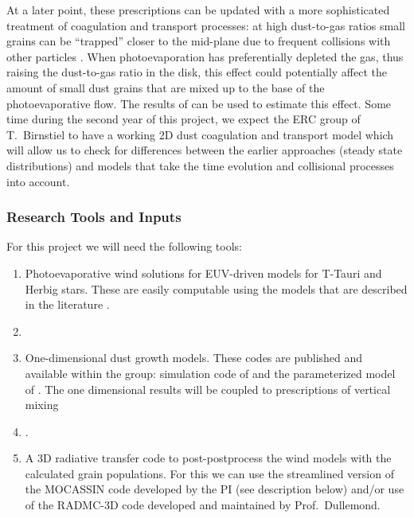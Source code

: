 \documentclass[10pt,fleqn,twoside]{article}
\begin{document}
At a later point, these prescriptions can be updated with a more
sophisticated treatment of coagulation and transport processes: at
high dust-to-gas ratios small grains can be ``trapped'' closer to the
mid-plane due to frequent collisions with other particles
\citep{2016ApJ...822..111K}. When photoevaporation has preferentially
depleted the gas, thus raising the dust-to-gas ratio in the disk, this
effect could potentially affect the amount of small dust grains that
are mixed up to the base of the photoevaporative flow. The results of
\citet{2016ApJ...822..111K} can be used to estimate this effect.
Some time during the second  year of this project, we expect the ERC
group of T.\ Birnstiel to have a working 2D dust coagulation and
transport model which will allow us to check for differences between
the earlier approaches (steady state distributions) and models that
take the time evolution and collisional processes into account.

\subsubsection{Research Tools and Inputs}

For this project we will need the following tools:
\begin{enumerate}
\item Photoevaporative wind solutions for EUV-driven
models for T-Tauri and Herbig stars. These are easily computable 
using the models that are described in the literature \citep[e.g.,][]{2004ApJ...607..890F}.
\item {}
\item One-dimensional dust growth models. These codes are published
and available within the group: simulation code of 
 \citet{2010A&A...513A..79B} and the parameterized model of
 \citet{2012A&A...539A.148B}. The one dimensional results will be
 coupled to prescriptions of vertical mixing \citep[e.g.,][]{2009A&A...496..597F}
\item {}.
\item A 3D radiative transfer code to post-postprocess the wind
models with the calculated grain populations. For this we can use the
streamlined version of the {\sc MOCASSIN} code developed by the PI
(see description below) and/or use  of the
{\sc RADMC-3D} code developed and maintained by Prof.\ Dullemond. 
\end{enumerate}
\end{document}
